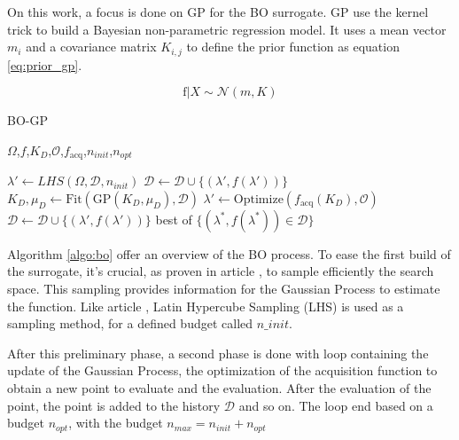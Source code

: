 \documentclass[runningheads]{llncs}
\begin{document}
On this work, a focus is done on GP for the BO surrogate. GP use the kernel trick to build a Bayesian non-parametric regression model. It uses a mean vector $m_i$ and a covariance matrix $K_{i,j}$ to define the prior function as equation \ref{eq:prior_gp}. 

\begin{equation}
    \text{f} | X \sim  \mathcal N (m,K)
    \label{eq:prior_gp}
\end{equation}

\begin{algorithm}[h]
\caption{BO-GP}
\label{algo:bo}
\begin{algorithmic}[1]
\Require 
    $\Omega$,$f$,$K_D$,$\mathcal{O}$,$f_{\text{acq}}$,$n_{init} $,$n_{opt}$
        
 
    \State $\lambda' \gets LHS(\Omega,\mathcal{D},n_{init})$ 
    \State $\mathcal{D} \gets \mathcal{D} \cup \{(\lambda', f(\lambda'))\}$ 
\EndFor 
{} 
    \State $K_D,\mu_D \gets \text{Fit}(\text{GP}(K_D,\mu_D), \mathcal{D})$ 
    \State $\lambda' \gets \text{Optimize}(f_{\text{acq}}(K_D), \mathcal{O})$ 
    \State $\mathcal{D} \gets \mathcal{D} \cup \{(\lambda', f(\lambda'))\}$ 
\EndFor
\State \Return best of $\{(\lambda^*, f(\lambda^*)) \in \mathcal{D}\}$
\end{algorithmic}
\end{algorithm}

Algorithm \ref{algo:bo} offer an overview of the BO process. To ease the first build of the surrogate, it's crucial, as proven in article \cite{wilson_efficiently_2020}, to sample efficiently the search space. This sampling provides information for the Gaussian Process to estimate the function. Like article \cite{borisut_adaptive_2023}, Latin Hypercube Sampling (LHS) is used as a sampling method, for a defined budget called $n\_init$. 

After this preliminary phase, a second phase is done with loop containing the update of the Gaussian Process, the optimization of the acquisition function to obtain a new point to evaluate and the evaluation. After the evaluation of the point, the point is added to the history $\mathcal D$ and so on. The loop end based on a budget $n_{opt}$, with the budget $n_{max}=n_{init}+n_{opt}$ 
\end{document}
